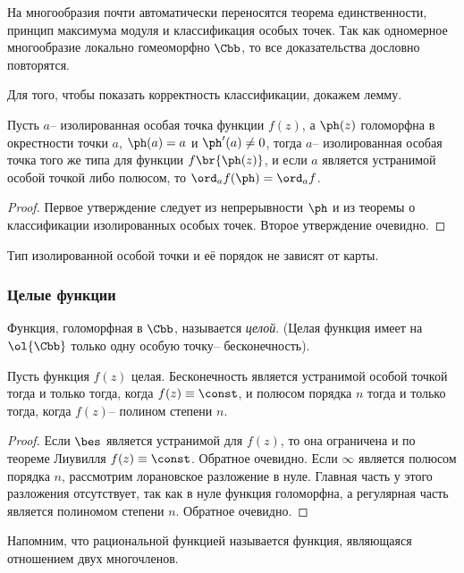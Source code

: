 \documentclass[a4paper]{article}
\begin{document}
На многообразия почти автоматически переносятся теорема единственности, принцип максимума модуля и
классификация особых точек. Так как одномерное многообразие локально гомеоморфно $\Cbb$, то все
доказательства дословно повторятся.

Для того, чтобы показать корректность классификации, докажем лемму.
\begin{lemma}
Пусть $a$-- изолированная особая точка функции $f(z)$, а $\ph(z)$ голоморфна в окрестности точки $a$,
$\ph(a)=a$ и $\ph'(a)\ne0$, тогда $a$-- изолированная особая точка того же типа для функции $f\br{\ph(z)}$, и  если
$a$ является устранимой особой точкой либо полюсом, то $\ord_a f(\ph)=\ord_a f$.
\end{lemma}
\begin{proof}
Первое утверждение следует из непрерывности $\ph$ и из теоремы о классификации изолированных особых точек.
Второе утверждение очевидно.
\end{proof}
\begin{imp}
Тип изолированной особой точки и её порядок не зависят от карты.
\end{imp}

\subsubsection{Целые функции}

\begin{df}
Функция, голоморфная в $\Cbb$, называется \emph{целой}. (Целая функция имеет на $\ol{\Cbb}$ только
одну особую точку-- бесконечность).
\end{df}

\begin{stm}
Пусть функция $f(z)$ целая. Бесконечность является устранимой особой точкой тогда и только тогда, когда
$f(z) \equiv \const$, и полюсом порядка $n$ тогда и только тогда, когда $f(z)$-- полином  степени $n$.
\end{stm}
\begin{proof}
Если $\bes$ является устранимой для $f(z)$, то она ограничена и по теореме Лиувилля $f(z)\equiv \const$.
Обратное очевидно.
Если $\infty$ является полюсом порядка $n$, рассмотрим лорановское разложение в нуле. Главная часть у
этого разложения отсутствует, так как в нуле функция голоморфна, а регулярная часть является полиномом степени $n$.
Обратное очевидно.
\end{proof}

Напомним, что рациональной функцией называется функция, являющаяся отношением двух многочленов.
\end{document}
